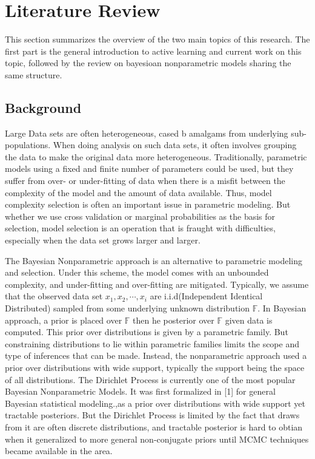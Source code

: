 \section{Literature Review}
This section summarizes the overview of the two main topics of this research. The first part is the general introduction to active learning and current work on this topic, followed by the review on bayesioan nonparametric models sharing the same structure. 
\newcommand{\argmax}[1]{\underset{#1}{\operatorname{arg}\,\operatorname{max}}\;}
\newcommand{\argmin}[1]{\underset{#1}{\operatorname{arg}\,\operatorname{min}}\;}
\subsection{Background}
Large Data sets are often heterogeneous, cased b amalgams from underlying sub-populations. When doing analysis on such data sets, it often involves grouping the data to make the original data more heterogeneous. Traditionally, parametric models using a fixed and finite number of parameters could be used, but they suffer from over- or under-fitting of data when there is a misfit between the complexity of the model and the amount of data available. Thus, model complexity selection is often an important issue in parametric modeling. But whether we use cross validation or marginal probabilities as the basis for selection, model selection is an operation that is fraught with difficulties, especially when the data set grows larger and larger. 

The Bayesian Nonparametric approach is an alternative to parametric modeling and selection. Under this scheme, the model comes with an unbounded complexity, and under-fitting and over-fitting are mitigated. Typically, we assume that the observed data set $x_1,x_2,\cdots,x_i$ are i.i.d(Independent Identical Distributed) sampled from some underlying unknown distribution $\mathbb{F}$. In Bayesian approach,  a prior is placed over $\mathbb{F}$ then he posterior over  $\mathbb{F}$ given data is computed. This prior over distributions is given by a parametric family. But constraining distributions to lie within parametric families limits the scope and type of inferences that can be made. Instead, the nonparametric approach used a prior over distributions with wide support, typically the support being the space of all distributions.  The Dirichlet Process is currently one of the most popular Bayesian Nonparametric Models. It was first formalized in [1] for general Bayesian statistical modeling.,as a prior over distributions with wide support yet tractable posteriors. But the Dirichlet Process is limited by the fact that draws from it are often discrete distributions, and tractable posterior is hard to obtian when it generalized to more general non-conjugate priors until MCMC techniques became available in the area. 
